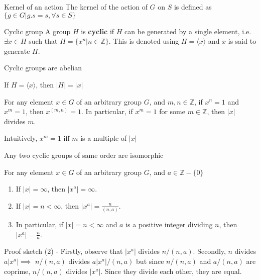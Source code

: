 \documentclass[titlepage, 12pt]{article}
\begin{document}
\begin{definition}{Kernel of an action}{}
    The kernel of the action of $G$ on $S$ is defined as $\{g\in G| g.s = s,
    \forall s\in S\}$
\end{definition}
\begin{definition}{Cyclic group}{}
    A group $H$ is \textbf{cyclic} if $H$ can be generated by a single element,
    i.e. $\exists x\in H$ such that $H = \{x^n| n\in \mathbb{Z}\}$. This is denoted
    using $H = \langle x\rangle$ and $x$ is said to generate $H$.
\end{definition}
\begin{proposition}{}{}
    Cyclic groups are abelian
\end{proposition}
\begin{proposition}{}{}
    If $H = \langle x\rangle$, then $| H| = | x|$
\end{proposition}
\begin{proposition}{}{}
    For any element $x\in G$ of an arbitrary group $G$, and $m, n\in
        \mathbb{Z}$,
        if $x^n = 1$ and $x^m = 1$, then $x^{(m, n)} = 1$. In particular, if
        $x^m = 1$ for some $m\in \mathbb{Z}$, then $|x|$ divides $m$.
\end{proposition}
Intuitively, $x^m = 1$ iff $m$ is a multiple of $|x|$
\begin{proposition}{}{}
    Any two cyclic groups of same order are isomorphic
\end{proposition}
\begin{proposition}{}{}
    For any element $x\in G$ of an arbitrary group $G$, and $a\in
        \mathbb{Z} - \{0\}$
        \begin{enumerate}
            \item If $|x| = \infty$, then $|x^a| = \infty$.
            \item If $|x| = n < \infty$, then $|x^a| = \frac{n}{(n, a)}$.
            \item In particular, if $|x| = n < \infty$ and $a$ is a positive integer
                dividing $n$, then $|x^a| = \frac{n}{a}$.
        \end{enumerate}
\end{proposition}
Proof sketch (2) - Firstly, observe that $|x^a|$ divides $n/(n, a)$. Secondly,
$n$ divides $a|x^a|\implies$ $n/(n, a)$ divides $a|x^a|/(n, a)$ but since $n/(n,
a)$ and $a/(n, a)$ are coprime, $n/(n, a)$ divides $|x^a|$. Since they divide
each other, they are equal.
\end{document}
